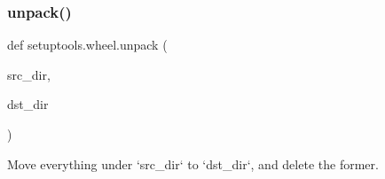 \subsubsection{\texorpdfstring{unpack()}{unpack()}}
{\footnotesize\ttfamily def setuptools.\+wheel.\+unpack (\begin{DoxyParamCaption}\item[{}]{src\+\_\+dir,  }\item[{}]{dst\+\_\+dir }\end{DoxyParamCaption})}

\begin{DoxyVerb}Move everything under `src_dir` to `dst_dir`, and delete the former.\end{DoxyVerb}
 